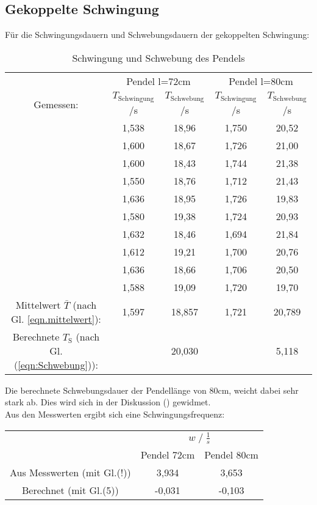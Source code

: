 \subsection{Gekoppelte Schwingung}
Für die Schwingungsdauern und Schwebungsdauern der gekoppelten Schwingung:
\begin{table}
    \centering
    \label{tab:Data_schw}
    \caption{Schwingung und Schwebung des Pendels}
    \begin{tabular}{c c | c || c | c}
        \toprule
        & \multicolumn{2}{c}{Pendel l=72cm} & \multicolumn{2}{c}{Pendel l=80cm} \\
        \cmidrule(lr){2-3}\cmidrule(lr){4-5}
        Gemessen: & $T_\text{Schwingung}$\;/\;s & $T_\text{Schwebung}$\;/\;s & $T_\text{Schwingung}$\;/\;s & $T_\text{Schwebung}$\;/\;s\\
        \midrule
        & 1,538 & 18,96 & 1,750 & 20,52 \\   
        & 1,600 & 18,67 & 1,726 & 21,00 \\
        & 1,600 & 18,43 & 1,744 & 21,38 \\
        & 1,550 & 18,76 & 1,712 & 21,43 \\
        & 1,636 & 18,95 & 1,726 & 19,83 \\
        & 1,580 & 19,38 & 1,724 & 20,93 \\
        & 1,632 & 18,46 & 1,694 & 21,84 \\
        & 1,612 & 19,21 & 1,700 & 20,76 \\
        & 1,636 & 18,66 & 1,706 & 20,50 \\
        & 1,588 & 19,09 & 1,720 & 19,70 \\
        \midrule
        Mittelwert $\bar{T}$ (nach Gl. \ref{eqn.mittelwert}): & 1,597 & 18,857 & 1,721 & 20,789 \\
        Berechnete $T_\textrm{S}$ (nach Gl.(\ref{eqn:Schwebung})):  &       & 20,030 &       &  5,118 \\
        \bottomrule
    \end{tabular}
\end{table}
Die berechnete Schwebungsdauer der Pendellänge von 80cm, weicht dabei sehr stark ab. Dies wird sich in der Diskussion () gewidmet.\\

Aus den Messwerten ergibt sich eine Schwingungsfrequenz:
\begin{table}
    \centering
    \label{tab:frq_gleichs}
    \begin{tabular}{c c c}
        \toprule
        & \multicolumn{2}{c}{$w\;/\;\frac{1}{s}$}\\
        \cmidrule(lr){2-3} 
        & Pendel 72cm & Pendel 80cm\\
        \midrule
        Aus Messwerten (mit Gl.(!)) & 3,934 & 3,653 \\
        Berechnet (mit Gl.(5))      & -0,031 & -0,103 \\
        \bottomrule
    \end{tabular}
\end{table}


